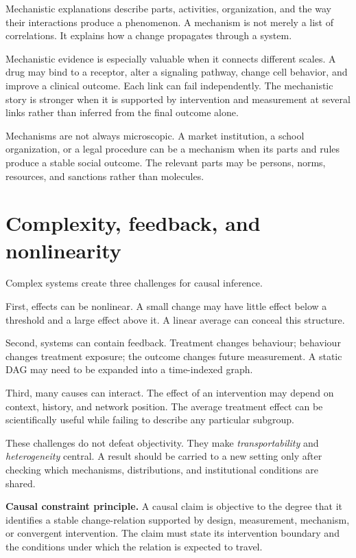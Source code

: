 Mechanistic explanations describe parts, activities, organization, and the
way their interactions produce a phenomenon. A mechanism is not merely a list
of correlations. It explains how a change propagates through a system.

Mechanistic evidence is especially valuable when it connects different scales.
A drug may bind to a receptor, alter a signaling pathway, change cell behavior,
and improve a clinical outcome. Each link can fail independently. The
mechanistic story is stronger when it is supported by intervention and
measurement at several links rather than inferred from the final outcome alone.

Mechanisms are not always microscopic. A market institution, a school
organization, or a legal procedure can be a mechanism when its parts and rules
produce a stable social outcome. The relevant parts may be persons, norms,
resources, and sanctions rather than molecules.

\section{Complexity, feedback, and nonlinearity}

Complex systems create three challenges for causal inference.

First, effects can be nonlinear. A small change may have little effect below a
threshold and a large effect above it. A linear average can conceal this
structure.

Second, systems can contain feedback. Treatment changes behaviour; behaviour
changes treatment exposure; the outcome changes future measurement. A static
DAG may need to be expanded into a time-indexed graph.

Third, many causes can interact. The effect of an intervention may depend on
context, history, and network position. The average treatment effect can be
scientifically useful while failing to describe any particular subgroup.

These challenges do not defeat objectivity. They make \emph{transportability}
and \emph{heterogeneity} central. A result should be carried to a new setting
only after checking which mechanisms, distributions, and institutional
conditions are shared.

\begin{principlebox}
\textbf{Causal constraint principle.} A causal claim is objective to the degree
that it identifies a stable change-relation supported by design, measurement,
mechanism, or convergent intervention. The claim must state its intervention
boundary and the conditions under which the relation is expected to travel.
\end{principlebox}

